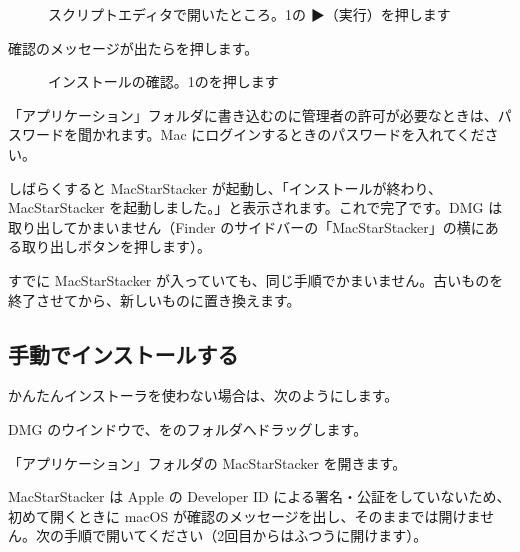 \begin{figure}[H]
\centering
{}
\caption{スクリプトエディタで開いたところ。\num{1}の ▶（実行）を押します}
\end{figure}

\begin{steps}[resume]
  \item 確認のメッセージが出たらを押します。
\end{steps}

\begin{figure}[H]
\centering
{}
\caption{インストールの確認。\num{1}のを押します}
\end{figure}

\begin{steps}[resume]
  \item 「アプリケーション」フォルダに書き込むのに管理者の許可が必要なときは、パスワードを聞かれます。Mac にログインするときのパスワードを入れてください。
  \item しばらくすると MacStarStacker が起動し、「インストールが終わり、MacStarStacker を起動しました。」と表示されます。これで完了です。DMG は取り出してかまいません（Finder のサイドバーの「MacStarStacker」の横にある取り出しボタンを押します）。
\end{steps}

\begin{memo}[新しい版に入れ替えるとき]
すでに MacStarStacker が入っていても、同じ手順でかまいません。古いものを終了させてから、新しいものに置き換えます。
\end{memo}

\subsection{手動でインストールする}\label{sec:install-manual}

かんたんインストーラを使わない場合は、次のようにします。

\begin{steps}
  \item DMG のウインドウで、をのフォルダへドラッグします。
  \item 「アプリケーション」フォルダの MacStarStacker を開きます。
\end{steps}

MacStarStacker は Apple の Developer ID による署名・公証をしていないため、初めて開くときに macOS が確認のメッセージを出し、そのままでは開けません。次の手順で開いてください（2回目からはふつうに開けます）。

